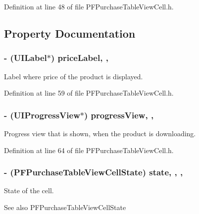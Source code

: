 Definition at line 48 of file P\+F\+Purchase\+Table\+View\+Cell.\+h.



\subsection{Property Documentation}
\hypertarget{interface_p_f_purchase_table_view_cell_a6378d4df911a53f6dca814d5f18af9aa}{}
\subsubsection[{price\+Label}]{\setlength{\rightskip}{0pt plus 5cm}-\/ (U\+I\+Label$\ast$) price\+Label\hspace{0.3cm}{\ttfamily [read]}, {\ttfamily [nonatomic]}, {\ttfamily [strong]}}\label{interface_p_f_purchase_table_view_cell_a6378d4df911a53f6dca814d5f18af9aa}
Label where price of the product is displayed. 

Definition at line 59 of file P\+F\+Purchase\+Table\+View\+Cell.\+h.

\hypertarget{interface_p_f_purchase_table_view_cell_a770a461f20f812e020c5b5daae002351}{}
\subsubsection[{progress\+View}]{\setlength{\rightskip}{0pt plus 5cm}-\/ (U\+I\+Progress\+View$\ast$) progress\+View\hspace{0.3cm}{\ttfamily [read]}, {\ttfamily [nonatomic]}, {\ttfamily [strong]}}\label{interface_p_f_purchase_table_view_cell_a770a461f20f812e020c5b5daae002351}
Progress view that is shown, when the product is downloading. 

Definition at line 64 of file P\+F\+Purchase\+Table\+View\+Cell.\+h.

\hypertarget{interface_p_f_purchase_table_view_cell_a8cf6055cf2d5913a1b9ae6f547354fae}{}
\subsubsection[{state}]{\setlength{\rightskip}{0pt plus 5cm}-\/ (P\+F\+Purchase\+Table\+View\+Cell\+State) state\hspace{0.3cm}{\ttfamily [read]}, {\ttfamily [write]}, {\ttfamily [nonatomic]}, {\ttfamily [assign]}}\label{interface_p_f_purchase_table_view_cell_a8cf6055cf2d5913a1b9ae6f547354fae}
State of the cell. \begin{DoxySeeAlso}{See also}
P\+F\+Purchase\+Table\+View\+Cell\+State 
\end{DoxySeeAlso}


